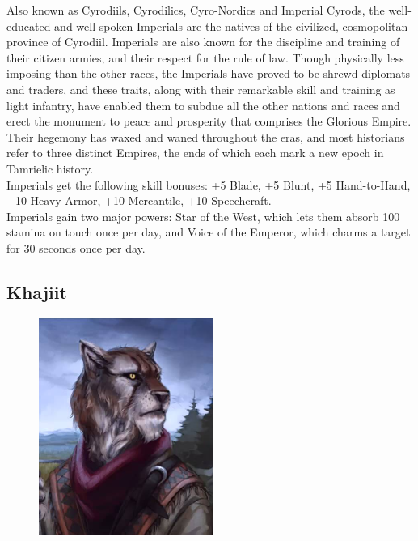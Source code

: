 \documentclass[12pt]{book}
\begin{document}
Also known as Cyrodiils, Cyrodilics, Cyro-Nordics and Imperial Cyrods, the well-educated and well-spoken Imperials are the natives of the civilized, cosmopolitan province of Cyrodiil. Imperials are also known for the discipline and training of their citizen armies, and their respect for the rule of law. Though physically less imposing than the other races, the Imperials have proved to be shrewd diplomats and traders, and these traits, along with their remarkable skill and training as light infantry, have enabled them to subdue all the other nations and races and erect the monument to peace and prosperity that comprises the Glorious Empire. Their hegemony has waxed and waned throughout the eras, and most historians refer to three distinct Empires, the ends of which each mark a new epoch in Tamrielic history.\\

Imperials get the following skill bonuses: +5 Blade, +5 Blunt, +5 Hand-to-Hand, +10 Heavy Armor, +10 Mercantile, +10 Speechcraft.\\

Imperials gain two major powers: Star of the West, which lets them absorb 100 stamina on touch once per day, and Voice of the Emperor, which charms a target for 30 seconds once per day.

\subsection{Khajiit}
\begin{figure}
	\includegraphics[width=\textwidth]{Khajiit.png}
\end{figure}
\end{document}

